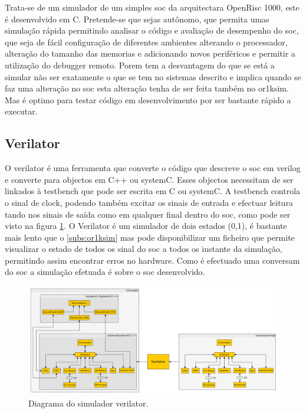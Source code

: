 Trata-se de um simulador de um simples \acrshort{soc} da arquitectara OpenRisc 1000, este é desenvolvido em C. Pretende-se que sejas autônomo, que permita umas simulação rápida permitindo analisar o código e avaliação de desempenho do \acrshort{soc}, que seja de fácil configuração de diferentes ambientes alterando o processador, alteração do tamanho das memorias e adicionando novos periféricos e permitir a utilização do debugger remoto. Porem tem a desvantagem do que se está a simular não ser exatamente o que se tem no sistemas descrito e implica quando se faz uma alteração no \acrshort{soc} esta alteração tenha de ser feita também no or1ksim. Mas é optimo para testar código em desenvolvimento por ser bastante rápido a executar. 

\subsection{Verilator}
\label{subs:verilator}


O verilator é uma ferramenta que converte o código que descreve o \acrshort{soc} em verilog e converte para objectos em C++ ou systemC. Esses objectos necessitam de ser linkados à testbench que pode ser escrita em C ou systemC. A testbench controla o sinal de clock, podendo também excitar os sinais de entrada e efectuar leitura tando nos sinais de saída como em qualquer final dentro do \acrshort{soc}, como pode ser visto na figura \ref{fig:verilator}. O Verilator é um simulador de dois estados (0,1), é bastante mais lento que o \ref{subs:or1ksim} mas pode disponibilizar um ficheiro que permite visualizar o estado de todos os sinal do \acrshort{soc} a todos os instante da simulação, permitindo assim encontrar erros no hardware. Como é efectuado uma conversam do \acrshort{soc} a simulação efetuada é sobre o \acrshort{soc} desenvolvido.

\begin{figure}[!htb]
  \centering
  \includegraphics[width=1.00\textwidth]{grafos/Verilator.pdf}
  \caption[Diagrama do simulador verilator]{Diagrama do simulador verilator.}
  \label{fig:verilator}
\end{figure}

